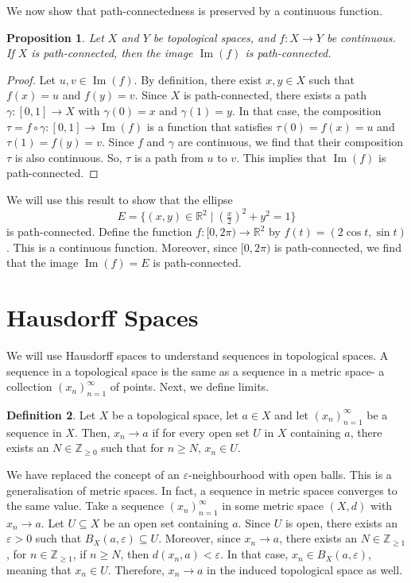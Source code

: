 \documentclass[a4paper, openany]{memoir}
\theoremstyle{definition}
\newtheorem{definition}{Definition}[section]
\theoremstyle{plain}
\newtheorem{proposition}[definition]{Proposition}
\begin{document}
We now show that path-connectedness is preserved by a continuous function.
\begin{proposition}
Let $X$ and $Y$ be topological spaces, and $f: X \to Y$ be continuous. If $X$ is path-connected, then the image $\operatorname{Im}(f)$ is path-connected.
\end{proposition}
\begin{proof}
Let $u, v \in \operatorname{Im}(f)$. By definition, there exist $x, y \in X$ such that $f(x) = u$ and $f(y) = v$. Since $X$ is path-connected, there exists a path $\gamma: [0, 1] \to X$ with $\gamma(0) = x$ and $\gamma(1) = y$. In that case, the composition $\tau = f \circ \gamma: [0, 1] \to \operatorname{Im}(f)$ is a function that satisfies $\tau(0) = f(x) = u$ and $\tau(1) = f(y) = v$. Since $f$ and $\gamma$ are continuous, we find that their composition $\tau$ is also continuous. So, $\tau$ is a path from $u$ to $v$. This implies that $\operatorname{Im}(f)$ is path-connected.
\end{proof}

We will use this result to show that the ellipse
\[E = \{(x, y) \in \mathbb{R}^2 \mid (\tfrac{x}{2})^2 + y^2 = 1\}\]
is path-connected. Define the function $f: [0, 2\pi) \to \mathbb{R}^2$ by $f(t) = (2 \cos t, \sin t)$. This is a continuous function. Moreover, since $[0, 2\pi)$ is path-connected, we find that the image $\operatorname{Im}(f) = E$ is path-connected.
\newpage

\section{Hausdorff Spaces}
We will use Hausdorff spaces to understand sequences in topological spaces. A sequence in a topological space is the same as a sequence in a metric space- a collection $(x_n)_{n=1}^{\infty}$ of points. Next, we define limits.
\begin{definition}
Let $X$ be a topological space, let $a \in X$ and let $(x_n)_{n=1}^{\infty}$ be a sequence in $X$. Then, $x_n \to a$ if for every open set $U$ in $X$ containing $a$, there exists an $N \in \mathbb{Z}_{\geqslant 0}$ such that for $n \geqslant N$, $x_n \in U$.
\end{definition}
We have replaced the concept of an $\varepsilon$-neighbourhood with open balls. This is a generalisation of metric spaces. In fact, a sequence in metric spaces converges to the same value. Take a sequence $(x_n)_{n=1}^{\infty}$ in some metric space $(X, d)$ with $x_n \to a$. Let $U \subseteq X$ be an open set containing $a$. Since $U$ is open, there exists an $\varepsilon > 0$ such that $B_X(a, \varepsilon) \subseteq U$. Moreover, since $x_n \to a$, there exists an $N \in \mathbb{Z}_{\geqslant 1}$, for $n \in \mathbb{Z}_{\geqslant 1}$, if $n \geqslant N$, then $d(x_n, a) < \varepsilon$. In that case, $x_n \in B_X(a, \varepsilon)$, meaning that $x_n \in U$. Therefore, $x_n \to a$ in the induced topological space as well.
\end{document}
